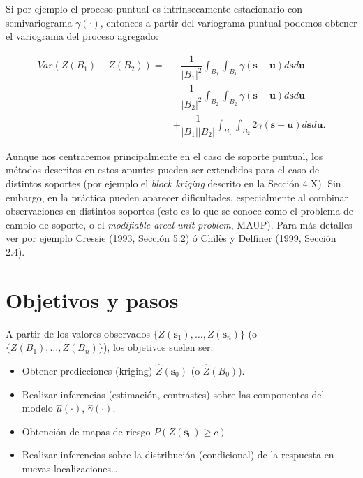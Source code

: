 \documentclass[
  spanish,
]{book}
\theoremstyle{break}
\begin{document}
Si por ejemplo el proceso puntual es intrínsecamente estacionario con semivariograma \(\gamma (\cdot)\), entonces a partir del variograma puntual podemos obtener el variograma del proceso agregado:

\[\begin{aligned}
Var\left( Z(B_1)-Z(B_2)\right) = & -\dfrac{1}{\left| B_1 \right| ^{2} } 
\int_{B_1 }\int_{B_1 }\gamma(\mathbf{s}-\mathbf{u})d\mathbf{s}d\mathbf{u}   \\
  & -\dfrac{1}{\left| B_2 \right|^{2} } \int_{B_2}\int_{B_2}\gamma(\mathbf{s}-\mathbf{u})d\mathbf{s}d\mathbf{u}   \\
 & +\dfrac{1}{\left| B_1 \right| \left| B_2 \right| } \int_{B_1 }\int_{B_2} 2\gamma(\mathbf{s}-\mathbf{u})d\mathbf{s}d\mathbf{u}. 
\end{aligned}\]

Aunque nos centraremos principalmente en el caso de soporte puntual, los métodos descritos en estos apuntes pueden ser extendidos para el caso de distintos soportes (por ejemplo el \emph{block kriging} descrito en la Sección 4.X).
Sin embargo, en la práctica pueden aparecer dificultades, especialmente al combinar observaciones en distintos soportes (esto es lo que se conoce como el problema de cambio de soporte, o el \emph{modifiable areal unit problem}, MAUP).
Para más detalles ver por ejemplo Cressie (1993, Sección 5.2) ó Chilès y Delfiner (1999, Sección 2.4).

\hypertarget{objetivos-esquema}{%
\section{Objetivos y pasos}\label{objetivos-esquema}}

A partir de los valores observados \(\{Z(\mathbf{s}_1), \ldots, Z(\mathbf{s}_n)\}\) (o \(\{Z(B_1), \ldots, Z(B_n)\}\)), los objetivos suelen ser:

\begin{itemize}
\item
  Obtener predicciones (kriging) \(\hat{Z}(\mathbf{s}_0)\) (o \(\hat{Z}(B_0)\)).
\item
  Realizar inferencias (estimación, contrastes) sobre las componentes
  del modelo \(\hat{\mu}(\cdot)\), \(\hat{\gamma}(\cdot)\).
\item
  Obtención de mapas de riesgo \(P({Z}(\mathbf{s}_0)\geq c)\).
\item
  Realizar inferencias sobre la distribución (condicional) de la respuesta
  en nuevas localizaciones\ldots{}
\end{itemize}
\end{document}
